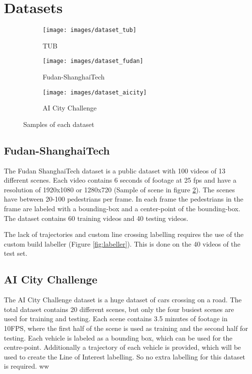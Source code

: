\section{Datasets}
\begin{figure}[h]
\centering
\begin{subfigure}{.33\textwidth}
  \centering
  \texttt{[image: images/dataset\_tub]}
  \caption{TUB}
  \label{fig:dataset_ucsd}
\end{subfigure}%
\begin{subfigure}{.33\textwidth}
  \centering
  \texttt{[image: images/dataset\_fudan]}
  \caption{Fudan-ShanghaiTech}
  \label{fig:dataset_fudan}
\end{subfigure}%
\begin{subfigure}{.33\textwidth}
  \centering
  \texttt{[image: images/dataset\_aicity]}
  \caption{AI City Challenge}
  \label{fig:dataset_aicity}
\end{subfigure}%
\caption{Samples of each dataset}
\label{fig:datasets}
\end{figure}

\subsection{Fudan-ShanghaiTech}
The Fudan ShanghaiTech dataset \cite{Fang2019} is a public dataset with 100 videos of 13 different scenes. Each video contains 6 seconds of footage at 25 fps and have a resolution of 1920x1080 or 1280x720 (Sample of scene in figure \ref{fig:dataset_fudan}). The scenes have between 20-100 pedestrians per frame. In each frame the pedestrians in the frame are labeled with a bounding-box and a center-point of the bounding-box. The dataset contains 60 training videos and 40 testing videos.

The lack of trajectories and custom line crossing labelling requires the use of the custom build labeller (Figure \ref{fig:labeller}). This is done on the 40 videos of the test set.

\subsection{AI City Challenge}
The AI City Challenge dataset is a huge dataset of cars crossing on a road. The total dataset contains 20 different scenes, but only the four busiest scenes are used for training and testing. Each scene contains 3.5 minutes of footage in 10FPS, where the first half of the scene is used as training and the second half for testing. Each vehicle is labeled as a bounding box, which can be used for the centre-point. Additionally a trajectory of each vehicle is provided, which will be used to create the Line of Interest labelling. So no extra labelling for this dataset is required. ww

